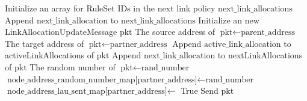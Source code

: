     \begin{algorithm}[H]    
      \begin{minipage}{0.8\linewidth}               
      \begin{algorithmic}[1]
      \State Initialize an array for RuleSet IDs in the next link policy $\text{next\_link\_allocations}$
            \State Append $\text{next\_link\_allocation}$ to $\text{next\_link\_allocations}$
          \EndFor
        \EndIf
        \EndFor
        \EndFor
      \EndFor
        \State Initialize an new LinkAllocationUpdateMessage $\text{pkt}$
        \State The source address of $\text{pkt} \gets \text{parent\_address}$ 
        \State The target address of $\text{pkt} \gets \text{partner\_address}$ 
          \State Append $\text{active\_link\_allocation}$ to activeLinkAllocations of $\text{pkt}$
        \EndFor
          \State Append $\text{next\_link\_allocation}$ to nextLinkAllocations of $\text{pkt}$
        \EndFor
        \State The random number of $\text{pkt} \gets \text{rand\_number}$ 
        \State $\text{node\_address\_random\_number\_map[partner\_address]} \gets \text{rand\_number}$
        \State $\text{node\_address\_lau\_sent\_map[partner\_address]} \gets$ True
        \State Send $\text{pkt}$
      \EndFor
    \EndFor
  \EndFunction
  \end{algorithmic}
  \label{algo:sendlau}
\end{minipage}
\end{algorithm}

